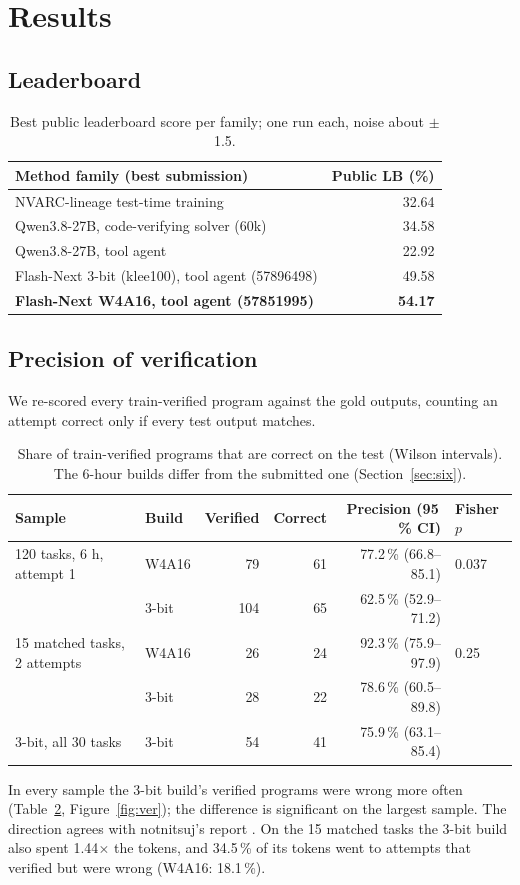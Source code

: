 \documentclass[11pt]{article}
\begin{document}
\section{Results}
\subsection{Leaderboard}
\begin{table}[h]
\centering\small
\begin{tabular}{@{}lr@{}}
\toprule
Method family (best submission) & Public LB (\%) \\
\midrule
NVARC-lineage test-time training & 32.64 \\
Qwen3.8-27B, code-verifying solver (60k) & 34.58 \\
Qwen3.8-27B, tool agent & 22.92 \\
Flash-Next 3-bit (klee100), tool agent (57896498) & 49.58 \\
\textbf{Flash-Next W4A16, tool agent (57851995)} & \textbf{54.17} \\
\bottomrule
\end{tabular}
\caption{Best public leaderboard score per family; one run each, noise about $\pm$1.5.}
\label{tab:lb}
\end{table}

\subsection{Precision of verification}\label{sec:precision}
We re-scored every train-verified program against the gold outputs, counting an attempt correct only if every test output matches.
\begin{table}[h]
\centering\small
\begin{tabular}{@{}llrrrl@{}}
\toprule
Sample & Build & Verified & Correct & Precision (95\,\% CI) & Fisher $p$ \\
\midrule
120 tasks, 6 h, attempt 1 & W4A16 & 79 & 61 & 77.2\,\% (66.8--85.1) & 0.037 \\
 & 3-bit & 104 & 65 & 62.5\,\% (52.9--71.2) & \\
15 matched tasks, 2 attempts & W4A16 & 26 & 24 & 92.3\,\% (75.9--97.9) & 0.25 \\
 & 3-bit & 28 & 22 & 78.6\,\% (60.5--89.8) & \\
3-bit, all 30 tasks & 3-bit & 54 & 41 & 75.9\,\% (63.1--85.4) & \\
\bottomrule
\end{tabular}
\caption{Share of train-verified programs that are correct on the test (Wilson intervals). The 6-hour builds differ from the submitted one (Section~\ref{sec:six}).}
\label{tab:prec}
\end{table}
In every sample the 3-bit build's verified programs were wrong more often (Table~\ref{tab:prec}, Figure~\ref{fig:ver}); the difference is significant on the largest sample. The direction agrees with notnitsuj's report \cite{notnitsuj2026}. On the 15 matched tasks the 3-bit build also spent 1.44$\times$ the tokens, and 34.5\,\% of its tokens went to attempts that verified but were wrong (W4A16: 18.1\,\%).
\end{document}
